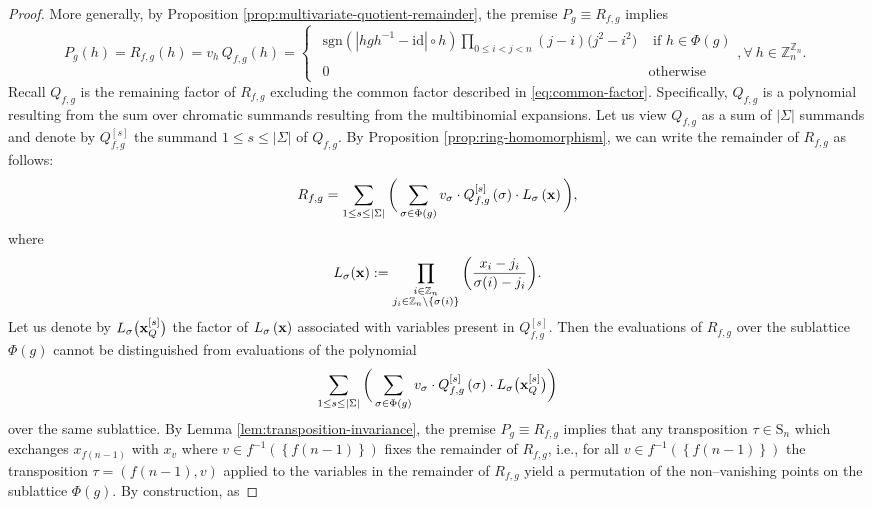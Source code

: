 \begin{proof}
More generally, by Proposition \ref{prop:multivariate-quotient-remainder}, the premise $P_{g}\equiv R_{f,g}$ implies 
\begin{equation}
P_{g}(h)=R_{f,g}\left(h\right)=v_{h}\,Q_{f,g}\left(h\right)=\begin{cases}
\begin{array}{cc}
\text{sgn}(\left|hgh^{-1}-\text{id}\right|\circ h)\underset{0\le i<j<n}{\prod}(j-i)\big(j^{2}-i^{2}) & \text{ if }h\in\Phi(g)\\
\\
0 & \text{otherwise}
\end{array},\forall\:h\in\mathbb{Z}_{n}^{\mathbb{Z}_{n}}.\end{cases}
\end{equation}
Recall $Q_{f,g}$ is the remaining factor of $R_{f,g}$ excluding the common factor described in \eqref{eq:common-factor}. Specifically, $Q_{f,g}$ is a polynomial resulting from the sum over chromatic summands resulting from the multibinomial expansions.  Let us view $Q_{f,g}$ as a sum of $|\Sigma|$ summands and denote by $Q_{f, g}^{\left[s\right]}$ the summand $1 \leq s \leq |\Sigma|$ of $Q_{f,g}$. By Proposition \ref{prop:ring-homomorphism}, we can write the remainder of $R_{f,g}$ as follows:
\[
R_{f,g}=\sum_{1\leq s\leq\left|\Sigma\right|}\bigg(\sum_{\sigma\in\Phi(g)}v_{\sigma}\cdot Q_{f,g}^{\left[s\right]}\left(\sigma\right)\cdot L_{\sigma}\left({\bf x}\right)\bigg),
\]
where
\[
L_{\sigma}({\bf x}):=\prod_{\substack{i\in\mathbb{Z}_{n}\\
j_{i}\in\mathbb{Z}_{n}\setminus\{\sigma(i)\}
}
}\bigg(\frac{x_{i}-j_{i}}{\sigma(i)-j_{i}}\bigg).
\]
Let us denote by ${L_{{\sigma}}\big({\bf x}_{Q}^{\left[s\right]}\big)}$ the factor of $L_{\sigma}\left({\bf x}\right)$ associated with variables present in $Q_{f,g}^{\left[s\right]}$. Then the evaluations of $R_{f,g}$ over the sublattice  $\Phi(g)$  cannot be distinguished from evaluations of the polynomial
 \[
 \sum_{1\leq s\leq\left|\Sigma\right|}\bigg(\sum_{\sigma\in\Phi(g)}v_{\sigma}\cdot Q_{f,g}^{\left[s\right]}\left(\sigma\right)\cdot L_{\sigma}\big({\bf x}_{Q}^{\left[s\right]}\big)\bigg)
 \] 
over the same sublattice. By Lemma \ref{lem:transposition-invariance}, the premise $P_{g}\equiv R_{f,g}$ 
implies that any transposition $\tau\in\text{S}_{n}$ which exchanges
$x_{f(n-1)}$ with $x_{v}$ where $v\in f^{-1}\left(\left\{ f\left(n-1\right)\right\} \right)$
fixes the remainder of $R_{f,g}$,
i.e., for all $v \in f^{-1}\left(\left\{ f\left(n-1\right)\right\} \right)$ the transposition $\tau=\left( f(n-1), v\right)$ applied to the variables in the remainder of $R_{ f, g}$ yield a permutation of the non--vanishing points on the sublattice $\Phi(g)$. By construction, as

\end{proof}
